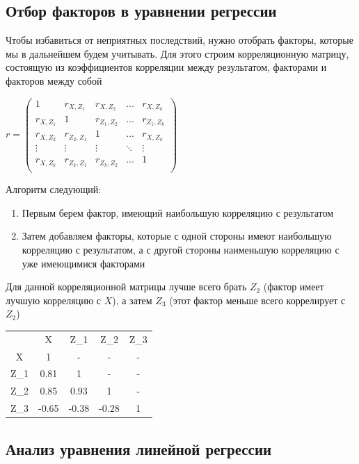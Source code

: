 \documentclass[12pt]{article}
\begin{document}
\subsection{Отбор факторов в уравнении регрессии}

Чтобы избавиться от неприятных последствий, нужно отобрать факторы, которые мы в дальнейшем будем учитывать. Для этого строим корреляционную матрицу, состоящую из коэффициентов корреляции между результатом, факторами и факторов между собой 

\smallvspace

$r = \begin{pmatrix}
    1 & r_{X, Z_1} & r_{X, Z_2} & \dots & r_{X, Z_k} \\ 
    r_{X, Z_1} & 1 & r_{Z_1, Z_2} & \dots & r_{Z_1, Z_k} \\ 
    r_{X, Z_2} & r_{Z_2, Z_1} & 1 & \dots & r_{X, Z_k} \\ 
    \vdots & \vdots & \vdots & \ddots & \vdots \\ 
    r_{X, Z_k} & r_{Z_k, Z_1} & r_{Z_k, Z_2} & \dots & 1 \\ 
\end{pmatrix}$

\smallvspace

Алгоритм следующий: 

\begin{enumerate}
    \item Первым берем фактор, имеющий наибольшую корреляцию с результатом
    \item Затем добавляем факторы, которые с одной стороны имеют наибольшую корреляцию с результатом, а с другой стороны наименьшую корреляцию с уже имеющимися факторами
\end{enumerate}

\Ex Для данной корреляционной матрицы лучше всего брать $Z_2$ (фактор имеет лучшую корреляцию с $X$), 
а затем $Z_3$ (этот фактор меньше всего коррелирует с $Z_2$)

\begin{tabular}{c|c|c|c|c}
    & X & Z_1 & Z_2 & Z_3 \\
    X & 1 & - & - & - \\
    Z_1 & 0.81 & 1 & - & - \\
    Z_2 & 0.85 & 0.93 & 1 & - \\
    Z_3 & -0.65 & -0.38 & -0.28 & 1
\end{tabular}

\subsection{Анализ уравнения линейной регрессии}
\end{document}
